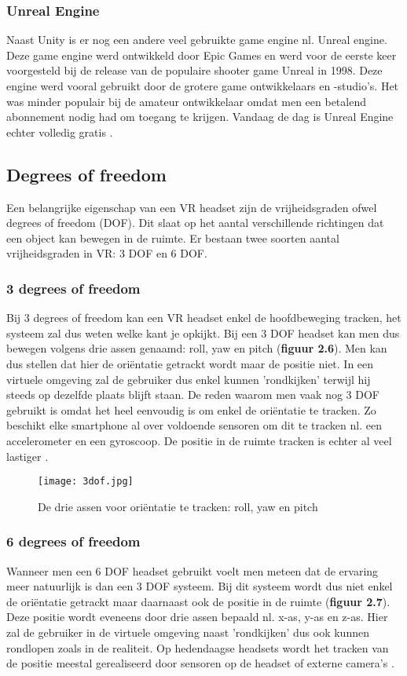 \subsubsection{Unreal Engine}
Naast Unity is er nog een andere veel gebruikte game engine nl. Unreal engine. Deze game engine werd ontwikkeld door Epic Games en werd voor de eerste keer voorgesteld bij de release van de populaire shooter game Unreal in 1998. Deze engine werd vooral gebruikt door de grotere game ontwikkelaars en -studio's. Het was minder populair bij de amateur ontwikkelaar omdat men een betalend abonnement nodig had om toegang te krijgen. Vandaag de dag is Unreal Engine echter volledig gratis \autocite{Sutorcen2016}.

\subsection{Degrees of freedom}

Een belangrijke eigenschap van een VR headset zijn de vrijheidsgraden ofwel degrees of freedom (DOF). Dit slaat op het aantal verschillende richtingen dat een object kan bewegen in de ruimte. Er bestaan twee soorten aantal vrijheidsgraden in VR: 3 DOF en 6 DOF. 

\subsubsection{3 degrees of freedom}
Bij 3 degrees of freedom kan een VR headset enkel de hoofdbeweging tracken, het systeem zal dus weten welke kant je opkijkt. Bij een 3 DOF headset kan men dus bewegen volgens drie assen genaamd: roll, yaw en pitch (\textbf{figuur 2.6}). Men kan dus stellen dat hier de oriëntatie getrackt wordt maar de positie niet. In een virtuele omgeving zal de gebruiker dus enkel kunnen 'rondkijken' terwijl hij steeds op dezelfde plaats blijft staan. De reden waarom men vaak nog 3 DOF gebruikt is omdat het heel eenvoudig is om enkel de oriëntatie te tracken. Zo beschikt elke smartphone al over voldoende sensoren om dit te tracken nl. een accelerometer en een gyroscoop. De positie in de ruimte tracken is echter al veel lastiger \autocite{Weis2018}.

\begin{figure}[h]
    \centering
    \texttt{[image: 3dof.jpg]}
    \caption{De drie assen voor oriëntatie te tracken: roll, yaw en pitch \autocite{Lang2013}}
\end{figure}

\subsubsection{6 degrees of freedom}
Wanneer men een 6 DOF headset gebruikt voelt men meteen dat de ervaring meer natuurlijk is dan een 3 DOF systeem. Bij dit systeem wordt dus niet enkel de oriëntatie getrackt maar daarnaast ook de positie in de ruimte (\textbf{figuur 2.7}). Deze positie wordt eveneens door drie assen bepaald nl. x-as, y-as en z-as. Hier zal de gebruiker in de virtuele omgeving naast 'rondkijken' dus ook kunnen rondlopen zoals in de realiteit. Op hedendaagse headsets wordt het tracken van de positie meestal gerealiseerd door sensoren op de headset of externe camera's \autocite{Weis2018}.

